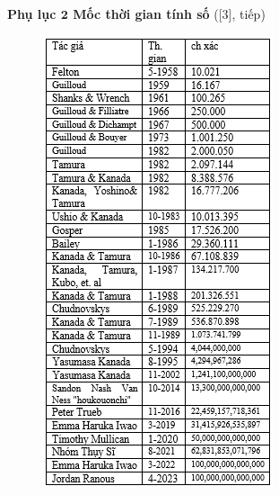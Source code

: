\begin{multicols}{2}
	\textbf{\color{lichsutoanhoc}Phụ lục $\pmb{2}$ Mốc thời gian tính số}  ([$3$], tiếp)
	\begin{figure}[H]
		\vspace*{-5pt}
		\centering
		\captionsetup{labelformat= empty, justification=centering}
		\includegraphics[width= 1\linewidth]{5}

\end{figure}
\end{multicols}
